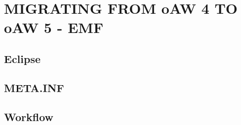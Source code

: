 \section{MIGRATING FROM oAW 4 TO oAW 5 - EMF}

\subsection{Eclipse}

\subsection{META.INF}

\subsection{Workflow}